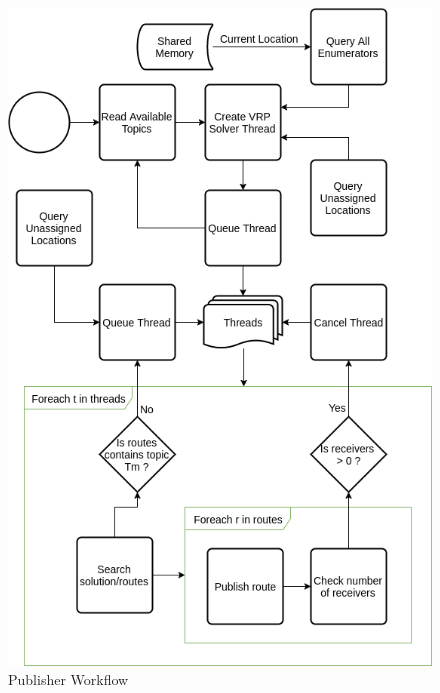 \begin{figure}[!]
	\centering
	\includegraphics[width=12cm]{Resources/Images/publisher-algorithm}
	\caption{Publisher Workflow}
	\label{fig:publisher-algorithm}
\end{figure}


